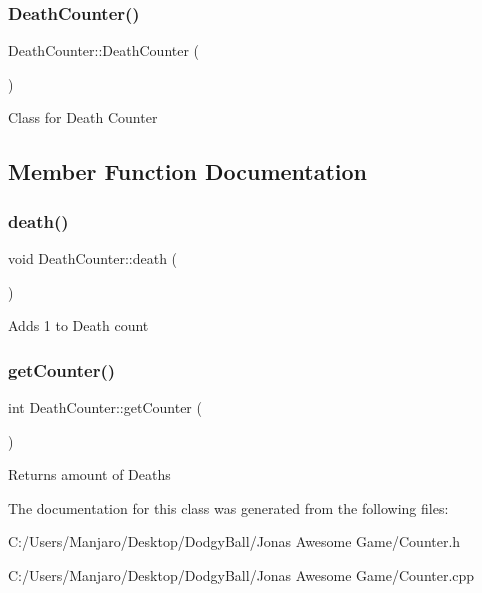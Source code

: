 \subsubsection{\texorpdfstring{DeathCounter()}{DeathCounter()}}
{\footnotesize\ttfamily Death\+Counter\+::\+Death\+Counter (\begin{DoxyParamCaption}{ }\end{DoxyParamCaption})}



Class for Death Counter 



\subsection{Member Function Documentation}
\mbox{\label{class_death_counter_a7c8c490a0dd1c935fc0de01ff2eec278}} 
\subsubsection{\texorpdfstring{death()}{death()}}
{\footnotesize\ttfamily void Death\+Counter\+::death (\begin{DoxyParamCaption}{ }\end{DoxyParamCaption})}



Adds 1 to Death count 

\mbox{\label{class_death_counter_a002c6fc9533e6fd3499590b24a2104ad}} 
\subsubsection{\texorpdfstring{getCounter()}{getCounter()}}
{\footnotesize\ttfamily int Death\+Counter\+::get\+Counter (\begin{DoxyParamCaption}{ }\end{DoxyParamCaption})}



Returns amount of Deaths 



The documentation for this class was generated from the following files\+:\begin{DoxyCompactItemize}
\item 
C\+:/\+Users/\+Manjaro/\+Desktop/\+Dodgy\+Ball/\+Jonas Awesome Game/Counter.\+h\item 
C\+:/\+Users/\+Manjaro/\+Desktop/\+Dodgy\+Ball/\+Jonas Awesome Game/Counter.\+cpp\end{DoxyCompactItemize}
